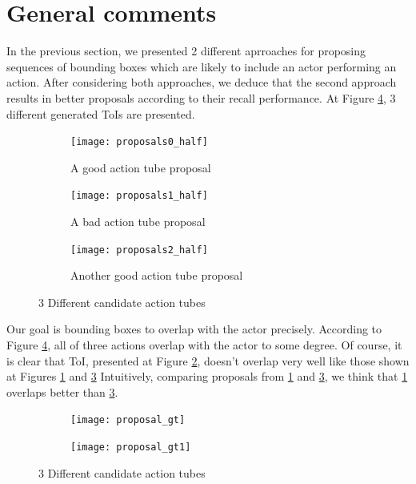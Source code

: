 \section{General comments}

In the previous section, we presented 2 different aprroaches for proposing sequences of bounding boxes which are likely to include an
actor performing an action. After considering both approaches, we deduce that the second approach results in better proposals
according to their recall performance. At Figure \ref{fig:proposals}, 3 different generated ToIs are presented.

\begin{figure}[h]
  \begin{subfigure}{1\textwidth}
    \centering
    \texttt{[image: proposals0\_half]}
    \caption{A good action tube proposal}
    \label{fig:proposals0}
  \end{subfigure}

  \begin{subfigure}{1\textwidth}
    \centering
    \texttt{[image: proposals1\_half]}
    \caption{A bad action tube proposal}
    \label{fig:proposals1}
  \end{subfigure}

  \begin{subfigure}{1\textwidth}
    \centering
    \texttt{[image: proposals2\_half]}
    \caption{Another good action tube proposal}
    \label{fig:proposals2}
  \end{subfigure}
  \caption{3 Different candidate action tubes}
  \label{fig:proposals}
\end{figure}

Our goal is bounding boxes to overlap with the actor precisely. According to Figure \ref{fig:proposals}, all of three actions overlap with the actor to some degree.
Of course, it is clear that ToI, presented at Figure \ref{fig:proposals1}, doesn't overlap very well like those shown at Figures \ref{fig:proposals0} and \ref{fig:proposals2}
Intuitively, comparing proposals from \ref{fig:proposals0} and \ref{fig:proposals2}, we think that \ref{fig:proposals0} overlaps better than \ref{fig:proposals2}.

\begin{figure}[h]
  \begin{subfigure}{1\textwidth}
    \centering
    \texttt{[image: proposal\_gt]}
    \caption{}
    \label{fig:proposals_gt0}
  \end{subfigure}

  \begin{subfigure}{1\textwidth}
    \centering
    \texttt{[image: proposal\_gt1]}
    \caption{}
    \label{fig:proposals_gt1}
  \end{subfigure}

  \caption{3 Different candidate action tubes}
  \label{fig:proposes_gt}
\end{figure}

